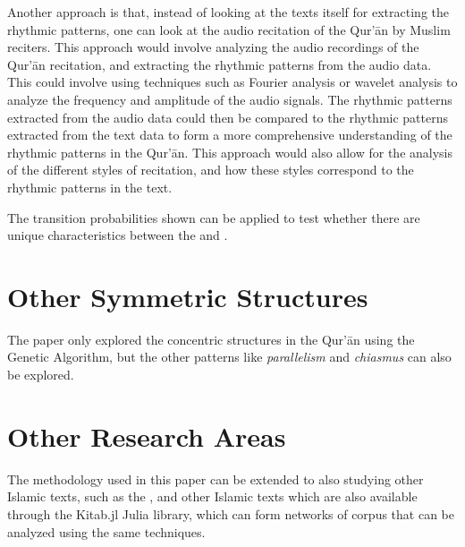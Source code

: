 Another approach is that, instead of looking at the texts itself for extracting the rhythmic patterns, one can look at the audio recitation of the Qur'\=an by Muslim reciters. This approach would involve analyzing the audio recordings of the Qur'\=an recitation, and extracting the rhythmic patterns from the audio data. This could involve using techniques such as Fourier analysis or wavelet analysis to analyze the frequency and amplitude of the audio signals. The rhythmic patterns extracted from the audio data could then be compared to the rhythmic patterns extracted from the text data to form a more comprehensive understanding of the rhythmic patterns in the Qur'\=an. This approach would also allow for the analysis of the different styles of recitation, and how these styles correspond to the rhythmic patterns in the text.

The transition probabilities shown can be applied to test whether there are unique characteristics between the    and    .

\section{Other Symmetric Structures}
The paper only explored the concentric structures in the Qur'\=an using the Genetic Algorithm, but the other patterns like \textit{parallelism} and \textit{chiasmus} can also be explored. 

\section{Other Research Areas}
The methodology used in this paper can be extended to also studying other Islamic texts, such as the  , and other Islamic texts which are also available through the Kitab.jl \cite{al_ahmadgaid_b_asaad_kitab} Julia library, which can form networks of corpus that can be analyzed using the same techniques.